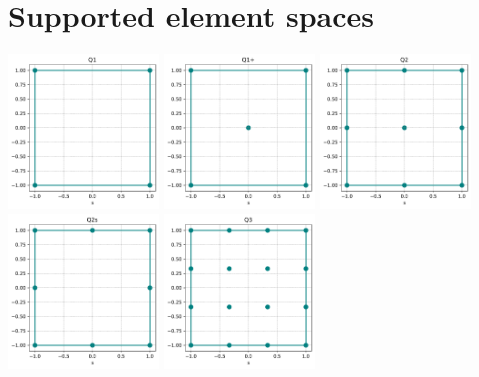 \newpage
\section*{Supported element spaces}

\begin{center}
\includegraphics[width=4cm]{python_codes/fieldstone_120/spaces/Q1_nodes}
\includegraphics[width=4cm]{python_codes/fieldstone_120/spaces/Q1+_nodes}
\includegraphics[width=4cm]{python_codes/fieldstone_120/spaces/Q2_nodes}\\
\includegraphics[width=4cm]{python_codes/fieldstone_120/spaces/Q2s_nodes}
\includegraphics[width=4cm]{python_codes/fieldstone_120/spaces/Q3_nodes}

\end{center}
